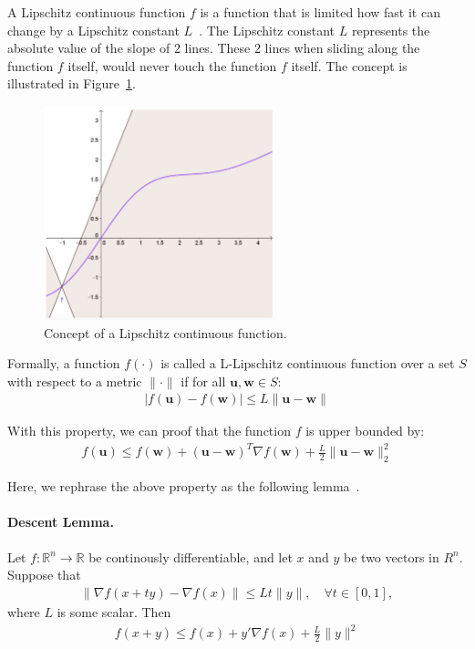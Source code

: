 \documentclass[11pt]{article}
\newcommand{\bw}{\boldsymbol{w}}
\newcommand{\bu}{\boldsymbol{u}}
\begin{document}
A Lipschitz continuous function $f$ is a function that is limited how fast it can change by a Lipschitz constant $L$~\cite{l_smooth}. The Lipschitz constant $L$ represents the absolute value of the slope of 2 lines. These 2 lines when sliding along the function $f$ itself, would never touch the function $f$ itself. The concept is illustrated in Figure~\ref{fig:l_smooth}.

\begin{figure}[H]
    \centering
    \includegraphics[width=0.6\textwidth]{Img/l_smooth.png}
    \caption{Concept of a Lipschitz continuous function.}
    \label{fig:l_smooth}
\end{figure}

Formally, a function $f(\cdot)$ is called a L-Lipschitz continuous function over a set $S$ with respect to a metric $\|\cdot\|$ if for all $\bu, \bw \in S$:
\begin{equation*}
\begin{split}
|f(\bu)-f(\bw)| \leq L \|\bu-\bw \|
\end{split}
\end{equation*}

With this property, we can proof that the function $f$ is upper bounded by:
\begin{equation*}
\begin{split}
f(\bu) \leq f(\bw) + (\bu-\bw)^T \nabla f(\bw) + \frac{L}{2} \|\bu-\bw\|^2_2
\end{split}
\end{equation*}

Here, we rephrase the above property as the following lemma~\cite{nonlinear_programming}.

\paragraph{Descent Lemma.} Let $f:\mathbb{R}^n \rightarrow \mathbb{R}$ be continously differentiable, and let $x$ and $y$ be two vectors in $R^n$. Suppose that
\begin{equation*}
\begin{split}
\|\nabla f(x+ty) - \nabla f(x)\| \leq L t\|y\|, \quad \forall t \in [0, 1],
\end{split}
\end{equation*}
where $L$ is some scalar. Then
\begin{equation*}
\begin{split}
f(x+y) \leq f(x) + y'\nabla f(x) + \frac{L}{2} \|y\|^2
\end{split}
\end{equation*}
\end{document}
